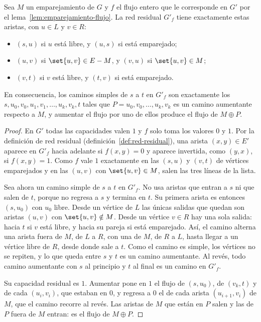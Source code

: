 \documentclass[11pt,letterpaper]{article}
\begin{document}
\begin{proposicion}
  \label{prop:emparejamiento-residual}
  Sea $M$ un emparejamiento de $G$ y $f$ el flujo entero que le
  corresponde en $G'$ por el lema~\ref{lem:emparejamiento-flujo}. La
  red residual $G'_f$ tiene exactamente estas aristas, con $u \in L$
  y $v \in R$:
  \begin{itemize}
    \item $(s, u)$ si $u$ está libre, y $(u, s)$ si está emparejado;
    \item $(u, v)$ si $\set{u, v} \in E - M$, y $(v, u)$ si
      $\set{u, v} \in M$;
    \item $(v, t)$ si $v$ está libre, y $(t, v)$ si está emparejado.
  \end{itemize}
  En consecuencia, los caminos simples de $s$ a $t$ en $G'_f$ son
  exactamente los $s, u_0, v_0, u_1, v_1, \dots, u_k, v_k, t$ tales
  que $P = u_0, v_0, \dots, u_k, v_k$ es un camino aumentante
  respecto a $M$, y aumentar el flujo por uno de ellos produce el
  flujo de $M \oplus P$.
\end{proposicion}

\begin{proof}
  En $G'$ todas las capacidades valen $1$ y $f$ solo toma los valores
  $0$ y $1$. Por la definición de red residual
  (definición~\ref{def:red-residual}), una arista $(x, y) \in E'$
  aparece en $G'_f$ hacia adelante si $f(x, y) = 0$ y aparece
  invertida, como $(y, x)$, si $f(x, y) = 1$. Como $f$ vale $1$
  exactamente en las $(s, u)$ y $(v, t)$ de vértices emparejados y en
  las $(u, v)$ con $\set{u, v} \in M$, salen las tres líneas de la
  lista.

  Sea ahora un camino simple de $s$ a $t$ en $G'_f$. No usa aristas
  que entran a $s$ ni que salen de $t$, porque no regresa a $s$ y
  termina en $t$. Su primera arista es entonces $(s, u_0)$ con $u_0$
  libre. Desde un vértice de $L$ las únicas salidas que quedan son
  aristas $(u, v)$ con $\set{u, v} \notin M$. Desde un vértice
  $v \in R$ hay una sola salida: hacia $t$ si $v$ está libre, y hacia
  su pareja si está emparejado. Así, el camino alterna una arista
  fuera de $M$, de $L$ a $R$, con una de $M$, de $R$ a $L$, hasta
  llegar a un vértice libre de $R$, desde donde sale a $t$. Como el
  camino es simple, los vértices no se repiten, y lo que queda entre
  $s$ y $t$ es un camino aumentante. Al revés, todo camino aumentante
  con $s$ al principio y $t$ al final es un camino en $G'_f$.

  Su capacidad residual es $1$. Aumentar pone en $1$ el flujo de
  $(s, u_0)$, de $(v_k, t)$ y de cada $(u_i, v_i)$, que estaban en
  $0$, y regresa a $0$ el de cada arista $(u_{i+1}, v_i)$ de $M$, que
  el camino recorre al revés. Las aristas de $M$ que están en $P$
  salen y las de $P$ fuera de $M$ entran: es el flujo de
  $M \oplus P$.
\end{proof}
\end{document}
